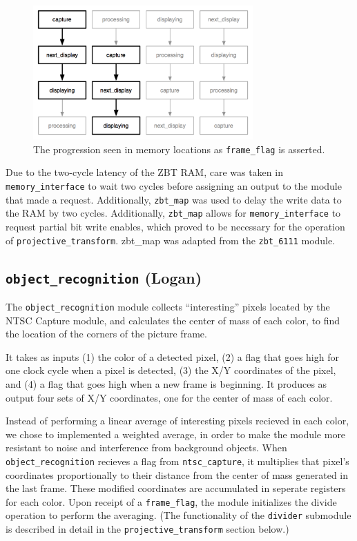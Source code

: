 \documentclass[10pt]{article}
\begin{document}
\begin{figure}[h!]
\centering
\includegraphics[width=0.75\textwidth]{images/buffers.png}
\caption{The progression seen in memory locations as {\tt frame\_flag} is asserted.}
\end{figure}

Due to the two-cycle latency of the ZBT RAM, care was taken in {\tt memory\_interface} to wait two cycles before assigning an output to the module that made a request. Additionally, {\tt zbt\_map} was used to delay the write data to the RAM by two cycles. Additionally, {\tt zbt\_map} allows for {\tt memory\_interface} to request partial bit write enables, which proved to be necessary for the operation of {\tt projective\_transform}. {zbt\_map} was adapted from the {\tt zbt\_6111} module.

\subsection{{\tt object\_recognition} (Logan)}
The {\tt object\_recognition} module collects ``interesting'' pixels located by the NTSC Capture module, and calculates the center of mass of each color, to find the location of the corners of the picture frame.

It takes as inputs (1) the color of a detected pixel, (2) a flag that goes high for one clock cycle when a pixel is detected, (3) the X/Y coordinates of the pixel, and (4) a flag that goes high when a new frame is beginning. It produces as output four sets of X/Y coordinates, one for the center of mass of each color.

Instead of performing a linear average of interesting pixels recieved in each color, we chose to implemented a weighted average, in order to make the module more resistant to noise and interference from background objects. When {\tt object\_recognition} recieves a flag from {\tt ntsc\_capture}, it multiplies that pixel's coordinates proportionally to their distance from the center of mass generated in the last frame. These modified coordinates are accumulated in seperate registers for each color. Upon receipt of a {\tt frame\_flag}, the module initializes the divide operation to perform the averaging. (The functionality of the {\tt divider} submodule is described in detail in the {\tt projective\_transform} section below.)
\end{document}
